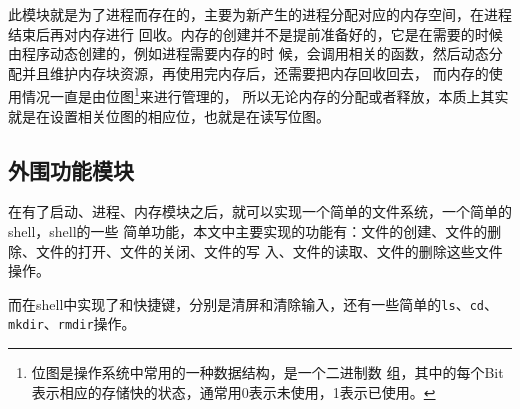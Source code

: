 此模块就是为了进程而存在的，主要为新产生的进程分配对应的内存空间，在进程结束后再对内存进行
回收。内存的创建并不是提前准备好的，它是在需要的时候由程序动态创建的，例如进程需要内存的时
候，会调用相关的函数，然后动态分配并且维护内存块资源，再使用完内存后，还需要把内存回收回去，
而内存的使用情况一直是由位图\footnote{位图是操作系统中常用的一种数据结构，是一个二进制数
  组，其中的每个Bit表示相应的存储快的状态，通常用0表示未使用，1表示已使用。}来进行管理的，
所以无论内存的分配或者释放，本质上其实就是在设置相关位图的相应位，也就是在读写位图。

\subsection{外围功能模块}

在有了启动、进程、内存模块之后，就可以实现一个简单的文件系统，一个简单的shell，shell的一些
简单功能，本文中主要实现的功能有：文件的创建、文件的删除、文件的打开、文件的关闭、文件的写
入、文件的读取、文件的删除这些文件操作。

而在shell中实现了和快捷键，分别是清屏和清除输入，还有一些简单的\texttt{ls}、\texttt{cd}、
\texttt{mkdir}、\texttt{rmdir}操作。 

